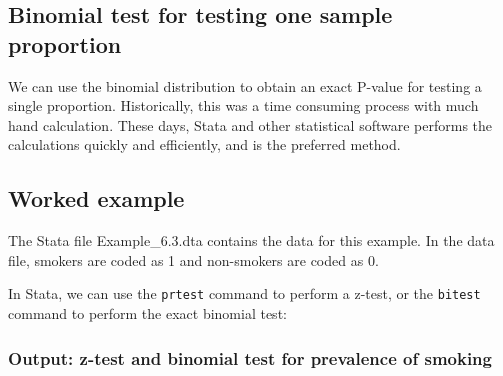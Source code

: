 \documentclass[
]{memoir}
\begin{document}
\hypertarget{binomial-test-for-testing-one-sample-proportion}{%
\subsection{Binomial test for testing one sample proportion}\label{binomial-test-for-testing-one-sample-proportion}}

We can use the binomial distribution to obtain an exact P-value for testing a single proportion. Historically, this was a time consuming process with much hand calculation. These days, Stata and other statistical software performs the calculations quickly and efficiently, and is the preferred method.

\hypertarget{worked-example-7}{%
\subsection{Worked example}\label{worked-example-7}}

The Stata file Example\_6.3.dta contains the data for this example. In the data file, smokers are coded as 1 and non-smokers are coded as 0.

In Stata, we can use the \texttt{prtest} command to perform a z-test, or the \texttt{bitest} command to perform the exact binomial test:

\hypertarget{output-z-test-and-binomial-test-for-prevalence-of-smoking}{%
\subsubsection*{Output: z-test and binomial test for prevalence of smoking}\label{output-z-test-and-binomial-test-for-prevalence-of-smoking}}
\end{document}
